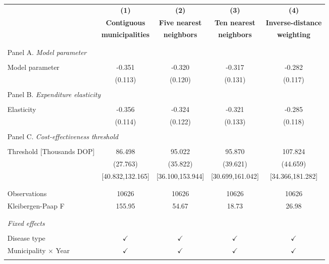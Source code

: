\begin{tabular}{l c c c c}
\toprule[1.5pt]
\multicolumn{1}{c}{\textbf{}} & \textbf{(1)} & \textbf{(2)} & \textbf{(3)} & \textbf{(4)}   \\
\multicolumn{1}{c}{\textbf{}} & \textbf{Contiguous} & \textbf{Five nearest} & \textbf{Ten nearest} & \textbf{Inverse-distance}   \\
\multicolumn{1}{c}{\textbf{}} & \textbf{municipalities} & \textbf{neighbors} & \textbf{neighbors} & \textbf{weighting}   \\ \hline \\
\\
\multicolumn{5}{l}{Panel A. \textit{Model parameter}}\\
\\
Model parameter & -0.351 & -0.320 & -0.317 & -0.282  \\
& (0.113) & (0.120)  & (0.131) & (0.117)  \\
\\
\multicolumn{5}{l}{Panel B. \textit{Expenditure elasticity}}\\
\\
Elasticity & -0.356 & -0.324 & -0.321 & -0.285  \\
& (0.114) & (0.122)  & (0.133) & (0.118)  \\
\\
\multicolumn{5}{l}{Panel C. \textit{Cost-effectiveness threshold}}\\
\\
Threshold [Thousands DOP] & 86.498 & 95.022  & 95.870 & 107.824  \\
& (27.763) & (35.822) & (39.621) & (44.659)  \\
& [40.832,132.165] & [36.100,153.944]  & [30.699,161.042]  & [34.366,181.282]   \\
\\
\midrule[1 pt]
\\
Observations & 10626 & 10626 &  10626 & 10626 \\
Kleibergen-Paap F & 155.95 & 54.67 & 18.73 & 26.98 \\
\\
\midrule[1 pt]
\\
\multicolumn{5}{l}{\textit{Fixed effects}} \\
\\
Disease type & $\checkmark$ & $\checkmark$ & $\checkmark$  & $\checkmark$ \\
Municipality $\times$ Year & $\checkmark$   &  $\checkmark$ & $\checkmark$ & $\checkmark$ \\
\\
\midrule[1 pt]
\end{tabular}
